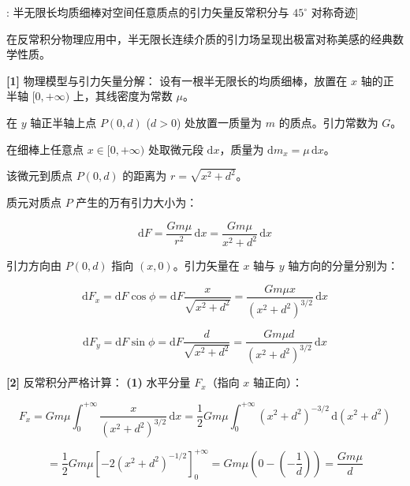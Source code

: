 \documentclass[11pt,a4paper,UTF8]{ctexart}
\begin{document}
\begin{thmbox}[模型[3]: 半无限长均质细棒对空间任意质点的引力矢量反常积分与 $45^\circ$ 对称奇迹]

在反常积分物理应用中，半无限长连续介质的引力场呈现出极富对称美感的经典数学性质。

\textbf{[1]} 物理模型与引力矢量分解：
设有一根半无限长的均质细棒，放置在 $x$ 轴的正半轴 $[0, +\infty)$ 上，其线密度为常数 $\mu$。

在 $y$ 轴正半轴上点 $P(0, d)$ ($d > 0$) 处放置一质量为 $m$ 的质点。引力常数为 $G$。

在细棒上任意点 $x \in [0, +\infty)$ 处取微元段 $\mathrm{d}x$，质量为 $\mathrm{d}m_x = \mu\,\mathrm{d}x$。

该微元到质点 $P(0, d)$ 的距离为 $r = \sqrt{x^2 + d^2}$。

质元对质点 $P$ 产生的万有引力大小为：


\begin{equation*}
\mathrm{d}F = \frac{G m \mu}{r^2}\,\mathrm{d}x = \frac{G m \mu}{x^2 + d^2}\,\mathrm{d}x
\end{equation*}


引力方向由 $P(0, d)$ 指向 $(x, 0)$。引力矢量在 $x$ 轴与 $y$ 轴方向的分量分别为：


\begin{equation*}
\mathrm{d}F_x = \mathrm{d}F \cos\phi = \mathrm{d}F \frac{x}{\sqrt{x^2 + d^2}} = \frac{G m \mu x}{(x^2 + d^2)^{3/2}}\,\mathrm{d}x
\end{equation*}



\begin{equation*}
\mathrm{d}F_y = \mathrm{d}F \sin\phi = \mathrm{d}F \frac{d}{\sqrt{x^2 + d^2}} = \frac{G m \mu d}{(x^2 + d^2)^{3/2}}\,\mathrm{d}x
\end{equation*}


\textbf{[2]} 反常积分严格计算：
\textbf{(1)}  \textit{}水平分量 $F_x$（指向 $x$ 轴正向）\textit{}：


\begin{equation*}
F_x = G m \mu \int_0^{+\infty} \frac{x}{(x^2 + d^2)^{3/2}}\,\mathrm{d}x = \frac{1}{2} G m \mu \int_0^{+\infty} (x^2 + d^2)^{-3/2}\,\mathrm{d}(x^2 + d^2)
\end{equation*}



\begin{equation*}
= \frac{1}{2} G m \mu \left[-2(x^2 + d^2)^{-1/2}\right]_0^{+\infty} = G m \mu \left(0 - \left(-\frac{1}{d}\right)\right) = \frac{G m \mu}{d}
\end{equation*}



\end{thmbox}
\end{document}
